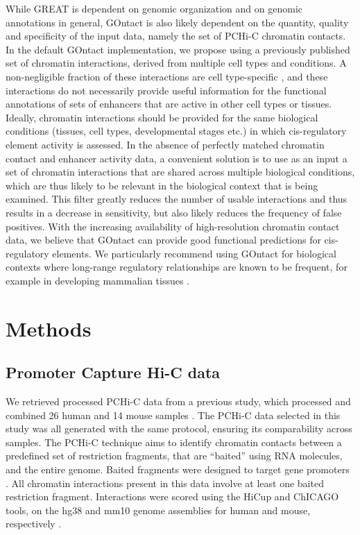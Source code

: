 While GREAT is dependent on genomic organization and on genomic annotations in general, GOntact is also likely dependent on the quantity, quality and specificity of the input data, namely the set of PCHi-C chromatin contacts. In the default GOntact implementation, we propose using a previously published set of chromatin interactions, derived from multiple cell types and conditions. A non-negligible fraction of these interactions are cell type-specific \citep{javierre_lineage-specific_2016, laverre_long-range_2022}, and these interactions do not necessarily provide useful information for the functional annotations of sets of enhancers that are active in other cell types or tissues. Ideally, chromatin interactions should be provided for the same biological conditions (tissues, cell types, developmental stages etc.) in which \gls{cis}-regulatory element activity is assessed. In the absence of perfectly matched chromatin contact and enhancer activity data, a convenient solution is to use as an input a set of chromatin interactions that are shared across multiple biological conditions, which are thus likely to be relevant in the biological context that is being examined. This filter greatly reduces the number of usable interactions and thus results in a decrease in sensitivity, but also likely reduces the frequency of false positives. With the increasing availability of high-resolution chromatin contact data, we believe that GOntact can provide good functional predictions for \gls{cis}-regulatory elements. We particularly recommend using GOntact for biological contexts where long-range regulatory relationships are known to be frequent, for example in developing mammalian tissues \citep{de_laat_topology_2013}. 


\section{Methods}
\subsection*{Promoter Capture Hi-C data}
We retrieved processed PCHi-C data from a previous study, which processed and combined 26 human and 14 mouse samples \citep{laverre_long-range_2022}. The PCHi-C data selected in this study was all generated with the same protocol, ensuring its comparability across samples. The PCHi-C technique aims to identify chromatin contacts between a predefined set of restriction fragments, that are “baited” using RNA molecules, and the entire genome. Baited fragments were designed to target gene promoters \citep{mifsud_mapping_2015, schoenfelder_pluripotent_2015}. All chromatin interactions present in this data involve at least one baited restriction fragment. Interactions were scored using the HiCup and ChICAGO tools, on the hg38 and mm10 genome assemblies for human and mouse, respectively \citep{wingett_hicup:_2015,cairns_chicago_2016}. 

